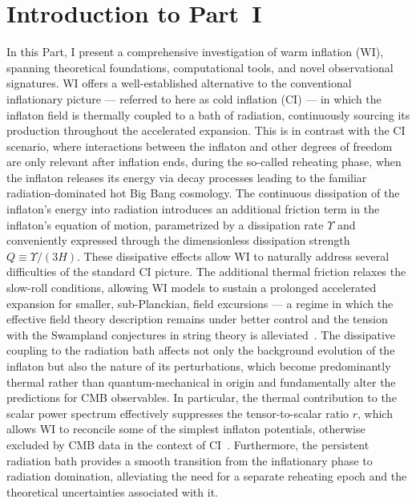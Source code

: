 \chapter*{Introduction to Part~I}
\label{ch:part1-intro}

In this Part, I present a comprehensive investigation of warm inflation (WI), spanning theoretical foundations, computational tools, and novel observational signatures. WI offers a well-established alternative to the conventional inflationary picture --- referred to here as cold inflation (CI) --- in which the inflaton field is thermally coupled to a bath of radiation, continuously sourcing its production throughout the accelerated expansion. This is in contrast with the CI scenario, where interactions between the inflaton and other degrees of freedom are only relevant after inflation ends, during the so-called reheating phase, when the inflaton releases its energy via decay processes leading to the familiar radiation-dominated hot Big Bang cosmology. The continuous dissipation of the inflaton's energy into radiation introduces an additional friction term in the inflaton's equation of motion, parametrized by a dissipation rate $\Upsilon$ and conveniently expressed through the dimensionless dissipation strength $Q \equiv \Upsilon/(3H)$. These dissipative effects allow WI to naturally address several difficulties of the standard CI picture. The additional thermal friction relaxes the slow-roll conditions, allowing WI models to sustain a prolonged accelerated expansion for smaller, sub-Planckian, field excursions --- a regime in which the effective field theory description remains under better control and the tension with the Swampland conjectures in string theory is alleviated~\cite{Das:2018hqy,Motaharfar:2018zyb,Brandenberger:2020oav}. The dissipative coupling to the radiation bath affects not only the background evolution of the inflaton but also the nature of its perturbations,  which become predominantly thermal rather than quantum-mechanical in origin and fundamentally alter the predictions for CMB observables. In particular, the thermal contribution to the scalar power spectrum effectively suppresses the tensor-to-scalar ratio $r$, which allows WI to reconcile some of the simplest inflaton potentials, otherwise excluded by CMB data in the context of CI~\cite{Planck:2018jri,BICEP:2021xfz,Benetti:2016jhf}. Furthermore, the persistent radiation bath provides a smooth transition from the inflationary phase to radiation domination, alleviating the need for a separate reheating epoch and the theoretical uncertainties associated with it.

